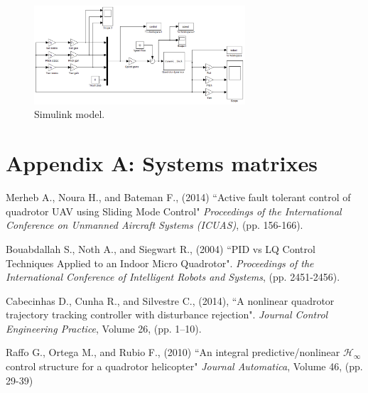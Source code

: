 \documentclass[12pt]{article}
\begin{document}
\begin{figure}
  \centering
  \includegraphics[width=0.7\textwidth]{Simulink.png}
  \caption{Simulink model.}
  \label{fig:model}
\end{figure}

\section{Appendix A: Systems matrixes}


 
\begin{thebibliography}{100} %
 Merheb A., Noura H., and Bateman F., (2014)
``Active fault tolerant control of quadrotor UAV using Sliding Mode Control"
\emph{Proceedings of the International Conference on Unmanned Aircraft Systems (ICUAS)},
(pp. 156-166).

 Bouabdallah S., Noth A., and Siegwart R., (2004) 
``PID vs LQ Control Techniques Applied to an Indoor Micro Quadrotor". 
\emph{Proceedings of the International Conference of Intelligent Robots and Systems}, 
(pp. 2451-2456).

 Cabecinhas D., Cunha R., and Silvestre C., (2014),
``A nonlinear quadrotor trajectory tracking controller with disturbance rejection".
\emph{Journal Control Engineering Practice}, Volume 26, (pp. 1–10).

 Raffo G., Ortega M., and Rubio F., (2010)
``An integral predictive/nonlinear $\mathcal{H} _\infty$ control structure for a quadrotor helicopter"
\emph{Journal Automatica}, Volume 46, (pp. 29-39)
\end{thebibliography}
\end{document}
